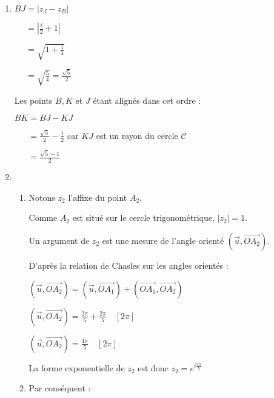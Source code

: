 \begin{corrige}
     \begin{enumerate}
          \item

     $BJ = \left|z_J-z_B\right|$
     \par
     $\phantom{BJ }= \left|\frac{i}{2}+1\right|$
     \par
     $\phantom{BJ }= \sqrt{1+\frac{1}{4}}$
     \par
     $\phantom{BJ }= \sqrt{\frac{5}{4}}=\frac{\sqrt{5}}{2}$
\begin{center}
\end{center}
     Les points $B, K$ et $J$ étant alignés dans cet ordre :
     \par
     $BK=BJ-KJ$
     \par
     $\phantom{BK}=\frac{\sqrt{5}}{2}-\frac{1}{2}$ car $KJ$ est un rayon du cercle $\mathscr C$
     \par
     $\phantom{BK}=\frac{\sqrt{5}-1}{2}$
     \item
     \begin{enumerate}[label=\alph*.]
          \item
          Notons $z_2$ l'affixe du point $A_2$.
          \par
          Comme $A_2$ est situé sur le cercle trigonométrique, $|z_2|=1 $.
          \par
          Un argument de $z_2$ est une mesure de l'angle orienté $(\vec{u}, \overrightarrow{OA_2})$.
          \par
          D'après la relation de Chasles sur les angles orientés :
          \par
          $(\vec{u}, \overrightarrow{OA_2})=(\vec{u}, \overrightarrow{OA_1})+(\overrightarrow{OA_1}, \overrightarrow{OA_2}) $
          \par
          $(\vec{u}, \overrightarrow{OA_2})=\frac{2\pi}{5}+\frac{2\pi}{5} \quad [2\pi] $
          \par
          $(\vec{u}, \overrightarrow{OA_2})=\frac{4\pi}{5} \quad [2\pi] $
          \par
          La forme exponentielle de $z_2$ est donc $z_2=e^{i \frac{4\pi}{5}}$
          \item
          Par conséquent :
          \par

\end{enumerate}
\end{enumerate}
\end{corrige}
